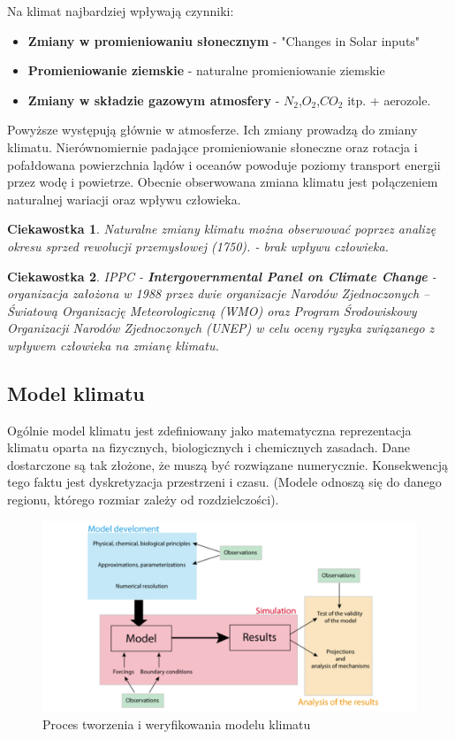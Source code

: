 \documentclass{article}
\theoremstyle{plain}
\newtheorem{ciekaw}{Ciekawostka}
\begin{document}
Na klimat najbardziej wpływają czynniki:
\begin{itemize}
	\item \textbf{Zmiany w promieniowaniu słonecznym} - "Changes in Solar inputs"
	\item \textbf{Promieniowanie ziemskie} - naturalne promieniowanie ziemskie
	\item \textbf{Zmiany w składzie gazowym atmosfery} - $N_2$,$O_2$,$CO_2$ itp. + aerozole.
\end{itemize}
Powyższe występują głównie w atmosferze. Ich zmiany prowadzą do zmiany klimatu. Nierównomiernie padające promieniowanie słoneczne oraz rotacja i pofałdowana powierzchnia lądów i oceanów  powoduje poziomy transport energii przez wodę i powietrze. Obecnie obserwowana zmiana klimatu jest połączeniem naturalnej wariacji oraz wpływu człowieka.
\begin{ciekaw}
	Naturalne zmiany klimatu można obserwować poprzez analizę okresu sprzed rewolucji przemysłowej (1750). - brak wpływu człowieka.
\end{ciekaw}
\begin{ciekaw}
IPPC - \textbf{Intergovernmental Panel on Climate Change} - organizacja założona w 1988 przez dwie organizacje Narodów Zjednoczonych – Światową Organizację Meteorologiczną (WMO) oraz Program Środowiskowy Organizacji Narodów Zjednoczonych (UNEP) w celu oceny ryzyka związanego z wpływem człowieka na zmianę klimatu.	
\end{ciekaw}
\subsection{Model klimatu}
Ogólnie model klimatu jest zdefiniowany jako matematyczna reprezentacja klimatu oparta na fizycznych, biologicznych i chemicznych zasadach. Dane dostarczone są tak złożone, że muszą być rozwiązane numerycznie. Konsekwencją tego faktu jest dyskretyzacja przestrzeni i czasu. (Modele odnoszą się do danego regionu, którego rozmiar zależy od rozdzielczości).
	\begin{figure}[h]
		\begin{center}
			\includegraphics[width=1.0\linewidth]{images/Figure9}
			\caption{Proces tworzenia i weryfikowania modelu klimatu}
		\end{center}
	\end{figure}
\end{document}
